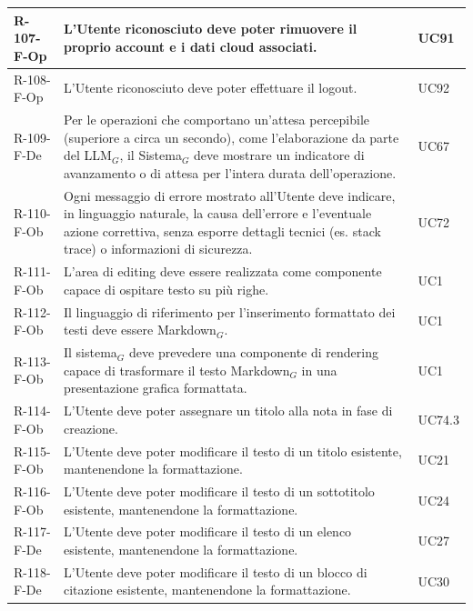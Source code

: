 \documentclass[a4paper, 10pt]{article}
\begin{document}
\begin{longtable}{|p{2.2cm}|p{7.5cm}|p{4cm}|}
R-107-F-Op & L'Utente riconosciuto deve poter rimuovere il proprio account e i dati cloud associati. & UC91 \\ \hline

R-108-F-Op & L'Utente riconosciuto deve poter effettuare il logout. & UC92 \\ \hline

R-109-F-De & Per le operazioni che comportano un'attesa percepibile (superiore a circa un secondo), come l'elaborazione da parte del LLM$_G$, il Sistema$_G$ deve mostrare un indicatore di avanzamento o di attesa per l'intera durata dell'operazione. & UC67 \\ \hline

R-110-F-Ob & Ogni messaggio di errore mostrato all'Utente deve indicare, in linguaggio naturale, la causa dell'errore e l'eventuale azione correttiva, senza esporre dettagli tecnici (es. stack trace) o informazioni di sicurezza. & UC72 \\ \hline

R-111-F-Ob & L'area di editing deve essere realizzata come componente capace di ospitare testo su più righe. & UC1 \\ \hline

R-112-F-Ob & Il linguaggio di riferimento per l'inserimento formattato dei testi deve essere Markdown$_G$. & UC1 \\ \hline

R-113-F-Ob & Il sistema$_G$ deve prevedere una componente di rendering capace di trasformare il testo Markdown$_G$ in una presentazione grafica formattata. & UC1 \\ \hline

R-114-F-Ob & L'Utente deve poter assegnare un titolo alla nota in fase di creazione. & UC74.3 \\ \hline

R-115-F-Ob & L'Utente deve poter modificare il testo di un titolo esistente, mantenendone la formattazione. & UC21 \\ \hline

R-116-F-Ob & L'Utente deve poter modificare il testo di un sottotitolo esistente, mantenendone la formattazione. & UC24 \\ \hline

R-117-F-De & L'Utente deve poter modificare il testo di un elenco esistente, mantenendone la formattazione. & UC27 \\ \hline

R-118-F-De & L'Utente deve poter modificare il testo di un blocco di citazione esistente, mantenendone la formattazione. & UC30 \\ \hline


\end{longtable}
\end{document}
